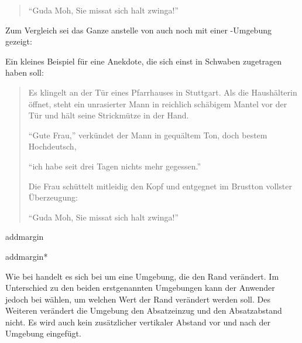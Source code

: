 \begin{Example}
\begin{ShowOutput}
\begin{quotation}
            "`Guda Moh, Sie missat sich halt zwinga!"'
          \end{quotation}
        \end{ShowOutput}%
        Zum Vergleich sei das Ganze anstelle von  auch
        noch mit einer -Umgebung gezeigt:%
        \begin{ShowOutput}
          \iftrue%
            Ein kleines Beispiel für eine Anekdote, die sich einst
            in Schwaben zugetragen haben soll:
          \fi
          \begin{quote}\setlength{\parskip}{4pt plus 2pt minus 2pt}
            Es klingelt an der Tür eines Pfarrhauses in Stuttgart. Als die
            Haushälterin öffnet, steht ein unrasierter Mann in reichlich
            schäbigem Mantel vor der Tür und hält seine Strickmütze in der Hand.

            "`Gute Frau,"' verkündet der Mann in gequältem Ton, doch bestem
            Hochdeutsch,

            "`ich habe seit drei Tagen nichts mehr gegessen."'

            Die Frau schüttelt mitleidig den Kopf und entgegnet im Brustton
            vollster Überzeugung:

            "`Guda Moh, Sie missat sich halt zwinga!"'
          \end{quote}
        \end{ShowOutput}
      \end{Example}%
    \fi
    \EndIndexGroup
\fi

\begin{Declaration}
  \begin{Environment}{addmargin}
  \end{Environment}
  \begin{Environment}{addmargin*}
  \end{Environment}
\end{Declaration}
Wie bei %
handelt es sich bei
 um eine Umgebung, die den Rand
verändert. Im Unterschied zu den beiden erstgenannten Umgebungen kann der
Anwender jedoch bei  wählen, um welchen Wert der Rand
verändert werden soll. Des Weiteren verändert die Umgebung den Absatzeinzug
und den Absatzabstand nicht. Es wird auch kein zusätzlicher vertikaler Abstand
vor und nach der Umgebung eingefügt.

